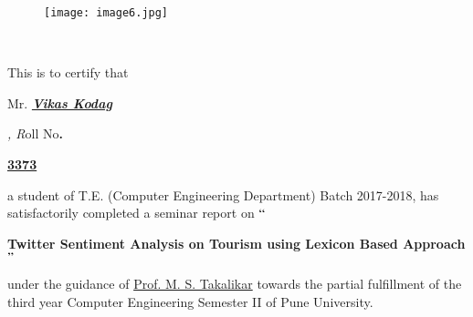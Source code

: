 \documentclass[12pt]{article}
\begin{document}

\begin{figure}[H]
	\begin{Center}
		\texttt{[image: image6.jpg]}
	\end{Center}
\end{figure}



\begin{justify}
{\fontsize{14pt}{16.8pt}\selectfont \ \ \ \ \ \ \ \ \ \ \ \ \ \ \ \ \ \ \ \ \ \ \ \ \ \ \ \ \ \ \ \ \ \ \ \ \ \ \ \ \ \ \ \ \  \par}
\end{justify}\par

\begin{justify}
{\fontsize{18pt}{21.6pt}\selectfont This is to certify that {\fontsize{20pt}{24.0pt}\selectfont Mr.\textit{ \textbf{\uline{Vikas Kodag}} }{\fontsize{18pt}{21.6pt}\selectfont \textit{, R}oll No\textbf{. }{\fontsize{20pt}{24.0pt}\selectfont \textbf{\uline{3373}}{\fontsize{18pt}{21.6pt}\selectfont \uline{ }a student of T.E. (Computer Engineering Department) Batch 2017-2018, has satisfactorily completed a seminar report on $``${\fontsize{16pt}{19.2pt}\selectfont \textbf{ Twitter Sentiment Analysis on Tourism using Lexicon Based Approach$"$ }{\fontsize{18pt}{21.6pt}\selectfont  under the guidance of \uline{Prof. M. S. Takalikar} towards the partial fulfillment of the third year Computer Engineering Semester II of Pune University.\par}\par}\par}\par}\par}\par}\par}
\end{justify}\par

\begin{justify}
{\fontsize{18pt}{21.6pt}\selectfont  \par}
\end{justify}\par


\vspace{\baselineskip}


\end{document}
